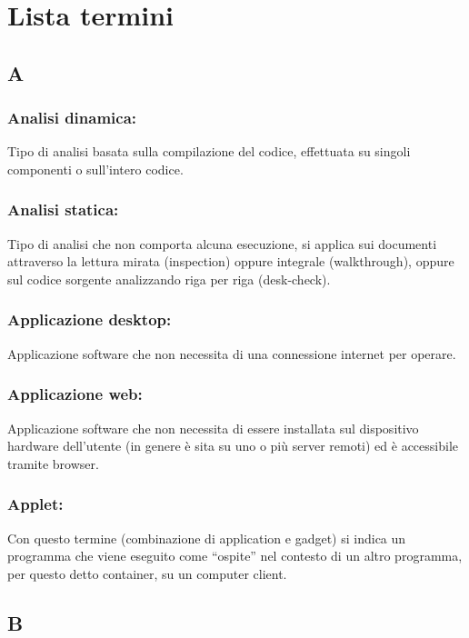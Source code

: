 \newpage
{}
\section*{Lista termini}

\subsection*{\huge{A}}

\subsubsection*{Analisi dinamica:}
Tipo di analisi basata sulla compilazione del codice, effettuata su singoli
componenti o sull'intero codice.

\subsubsection*{Analisi statica:}
Tipo di analisi che non comporta alcuna esecuzione, si applica sui
documenti attraverso la lettura mirata (inspection) oppure integrale
(walkthrough), oppure sul codice sorgente analizzando riga per riga (desk-check).

\subsubsection*{Applicazione desktop:}
Applicazione software che non necessita di una connessione internet per operare.

\subsubsection*{Applicazione web:}
Applicazione software che non necessita di essere installata sul dispositivo
hardware dell'utente (in genere \`e sita su uno o pi\`u server remoti) ed \`e accessibile tramite browser.

\subsubsection*{Applet:}
Con questo termine (combinazione di application e gadget) si indica un programma
che viene eseguito come ``ospite'' nel contesto di un altro programma, per questo
detto container, su un computer client.

\subsection*{\huge{B}}

